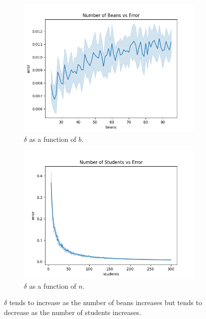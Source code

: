 \documentclass{article}
\begin{document}
\begin{figure}[h]
    \centering
    \begin{subfigure}{0.49\textwidth}
        \centering
        \includegraphics[width=\linewidth]{images/beans_error_beans.png}
        \caption{$\delta$ as a function of $b$.}
        \label{fig:fig1a}
    \end{subfigure}
    \hfill
    \begin{subfigure}{0.49\textwidth}
        \centering
        \includegraphics[width=\linewidth]{images/students_error_beans.png}
        \caption{$\delta$ as a function of $n$.}
        \label{fig:fig1b}
    \end{subfigure}
    \caption{$\delta$ tends to increase as the number of beans increases but tends to decrease as the number of students increases.}
    \label{fig:fig1}
\end{figure}
\end{document}
